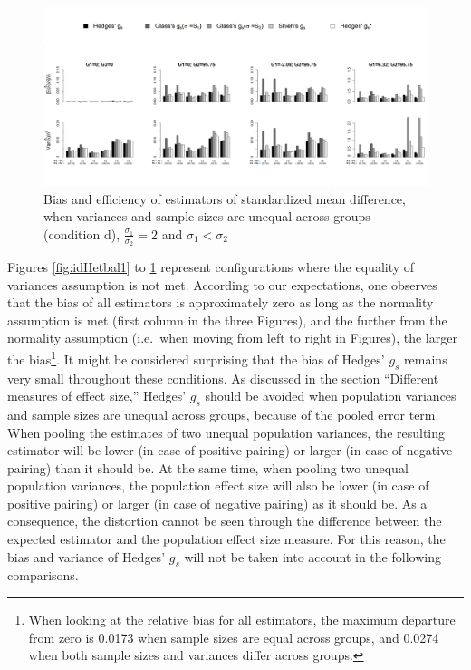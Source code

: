 \documentclass[
  english,
  man,floatsintext]{apa6}
\begin{document}
\begin{figure}

{\centering \includegraphics[width=6.31in]{Scripts outputs/Quality of ES measures/Graphs/Unbiased estimators/Combined Figures_relative quality/Het_firstsmaller_SDR2} 

}

\caption{Bias and efficiency of estimators of standardized mean difference, when variances and sample sizes are unequal across groups (condition d), $\frac{\sigma_1}{\sigma_2}=2$ and $\sigma_1<\sigma_2$}\label{fig:idHetunbal4}
\end{figure}

Figures \ref{fig:idHetbal1} to \ref{fig:idHetunbal4} represent configurations where the equality of variances assumption is not met. According to our expectations, one observes that the bias of all estimators is approximately zero as long as the normality assumption is met (first column in the three Figures), and the further from the normality assumption (i.e.~when moving from left to right in Figures), the larger the bias\footnote{When looking at the relative bias for all estimators, the maximum departure from zero is 0.0173 when sample sizes are equal across groups, and 0.0274 when both sample sizes and variances differ across groups.}. It might be considered surprising that the bias of Hedges' \(g_s\) remains very small throughout these conditions. As discussed in the section ``Different measures of effect size,'' Hedges' \(g_s\) should be avoided when population variances and sample sizes are unequal across groups, because of the pooled error term. When pooling the estimates of two unequal population variances, the resulting estimator will be lower (in case of positive pairing) or larger (in case of negative pairing) than it should be. At the same time, when pooling two unequal population variances, the population effect size will also be lower (in case of positive pairing) or larger (in case of negative pairing) as it should be. As a consequence, the distortion cannot be seen through the difference between the expected estimator and the population effect size measure. For this reason, the bias and variance of Hedges' \(g_s\) will not be taken into account in the following comparisons.
\end{document}
